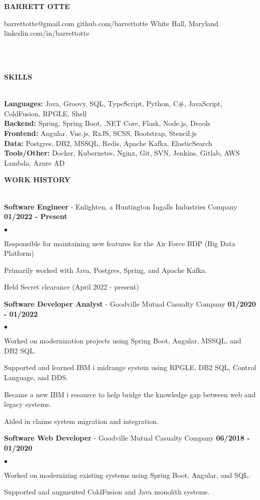 \documentclass{article}
\newcommand{\lineunder}{
	\vspace*{-4pt}\\ 
	\hspace*{-18pt}\hrulefill \\
}
\newcommand{\header}[1]{
	{\hspace*{-15pt}\vspace*{6pt}\textsc{#1}}\vspace*{-6pt}\lineunder
}
\newcommand{\employer}[3]{
	\textbf{#1} - #2 \vspace*{2pt} \hfill \textbf{#3} \vspace*{2pt}
}
\newcommand{\contact}[5]{
	\begin{center}
		{\Large \textbf \scshape \bfseries{#1}}
	\end{center}
	\small{#2} \hfill \small{#3} \break
	\small{#4} \hfill \small{#5} \break
	\vspace*{-6pt}
	\lineunder
	\vspace*{-6pt}
}
\newenvironment{resumelist}{
	\vspace*{2pt}
	\begin{list}
		{\small$\bullet$}{\topsep 0pt \itemsep -2pt}}{\vspace*{4pt}
	\end{list}
}
\newcommand{\resumeheader}[1]{
	\vspace*{14pt}
	\header{\textbf{#1}}
    \vspace*{5pt}
}
\begin{document}
	\normalsize
	\smallskip
	\vspace*{-44pt}

	\contact
		{BARRETT OTTE}
		{barrettotte@gmail.com}
		{github.com/barrettotte}
		{White Hall, Maryland}
		{linkedin.com/in/barrettotte}

	\resumeheader{SKILLS}
		\textbf{Languages:}
			Java, Groovy, SQL, TypeScript, Python, C\#, JavaScript, ColdFusion, RPGLE, Shell\\
			\vspace*{5pt}
        \textbf{Backend:}
			Spring, Spring Boot, .NET Core, Flask, Node.js, Drools\\
			\vspace*{5pt}
		\textbf{Frontend:}
			Angular, Vue.js, RxJS, SCSS, Bootstrap, Stencil.js\\
			\vspace*{5pt}
        \textbf{Data:}
			Postgres, DB2, MSSQL, Redis, Apache Kafka, ElasticSearch\\
			\vspace*{5pt}
		\textbf{Tools/Other:}
			Docker, Kubernetes, Nginx, Git, SVN, Jenkins, Gitlab, AWS Lambda, Azure AD\\
			\vspace*{5pt}

	\resumeheader{WORK HISTORY}
		\employer
			{Software Engineer}{Enlighten, a Huntington Ingalls Industries Company}{01/2022 - Present}
			\begin{resumelist}
				\item Responsible for maintaining new features for the Air Force BDP (Big Data Platform)
				\item Primarily worked with Java, Postgres, Spring, and Apache Kafka.
				\item Held Secret clearance (April 2022 - present)
			\end{resumelist}
			\vspace*{6pt}
        \employer
			{Software Developer Analyst}{Goodville Mutual Casualty Company}{01/2020 - 01/2022}
			\begin{resumelist}
				\item Worked on modernization projects using Spring Boot, Angular, MSSQL, and DB2 SQL.
				\item Supported and learned IBM i midrange system using RPGLE, DB2 SQL, Control Language, and DDS.
				\item Became a new IBM i resource to help bridge the knowledge gap between web and legacy systems.
				\item Aided in claims system migration and integration.
			\end{resumelist}
            \vspace*{6pt}
		\employer
			{Software Web Developer}{Goodville Mutual Casualty Company}{06/2018 - 01/2020}
			\begin{resumelist}
				\item Worked on modernizing existing systems using Spring Boot, Angular, and SQL.
				\item Supported and augmented ColdFusion and Java monolith systems.
			\end{resumelist}
\end{document}
